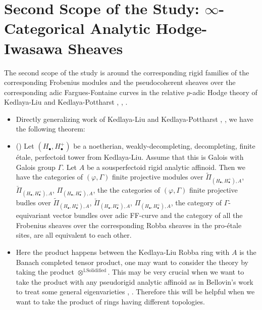 \documentclass[11pt]{report}
\begin{document}
\newpage








\section{Second Scope of the Study: $\infty$-Categorical Analytic Hodge-Iwasawa Sheaves}
	
\indent The second scope of the study is around the corresponding rigid families of the corresponding Frobenius modules and the pseudocoherent sheaves over the corresponding adic Fargues-Fontaine curves in the relative $p$-adic Hodge theory of Kedlaya-Liu and Kedlaya-Pottharst \cite{KL1}, \cite{KL2}, \cite{KP}. 
\begin{itemize}
\justifying
\item<1-> Directly generalizing work of Kedlaya-Liu and Kedlaya-Pottharst \cite{KL1}, \cite{KL2}, \cite{KP} we have the following theorem:

\item<2-> ()
Let $(H_\bullet,H_\bullet^+)$ be a noetherian, weakly-decompleting, decompleting, finite \'etale, perfectoid tower from Kedlaya-Liu. Assume that this is Galois with Galois group $\Gamma$. Let $A$ be a sousperfectoid rigid analytic affinoid. Then we have the categories of $(\varphi,\Gamma)$ finite projective modules over $\widetilde{\Pi}_{(H_\bullet,H_\bullet^+),A}$, $\breve{\Pi}_{(H_\bullet,H_\bullet^+),A}$, ${\Pi}_{(H_\bullet,H_\bullet^+),A}$, the the categories of $(\varphi,\Gamma)$ finite projective budles over $\widetilde{\Pi}_{(H_\bullet,H_\bullet^+),A}$, $\breve{\Pi}_{(H_\bullet,H_\bullet^+),A}$, ${\Pi}_{(H_\bullet,H_\bullet^+),A}$, the category of $\Gamma$-equivariant vector bundles over adic FF-curve and the category of all the Frobenius sheaves over the corresponding Robba sheaves in the pro-\'etale sites, are all equivalent to each other.

\item<3-> Here the product happens between the Kedlaya-Liu Robba ring with $A$ is the Banach completed tensor product, one may want to consider the theory by taking the product $\otimes^{\mathbb{L}\mathrm{Solidified}}$. This may be very crucial when we want to take the product with any pseudorigid analytic affinoid as in Bellovin's work to treat some general eigenvarieties \cite{3Bel1}, \cite{Bel2}. Therefore this will be helpful when we want to take the product of rings having different topologies.
 




\end{itemize}
\end{document}
